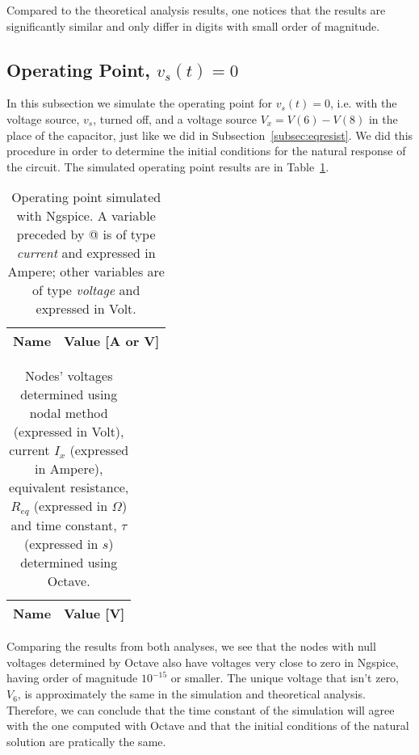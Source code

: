 Compared to the theoretical analysis results, one notices that the results are significantly similar and only differ in digits with small order of magnitude.

\subsection{Operating Point, $v_s(t)=0$} \label{subsec:op2}

In this subsection we simulate the operating point for $v_s(t)=0$, i.e. with the voltage source, $v_s$, turned off, and a voltage source $V_x=V(6)-V(8)$ in the place of the capacitor, just like we did in Subsection~\ref{subsec:eqresist}. We did this procedure in order to determine the initial conditions for the natural response of the circuit. The simulated operating point results are in Table~\ref{tab:op21}.

\vspace{1mm}

\begin{table}[H]
  \centering
  \begin{tabular}{|l|r|}
    \hline    
    {\bf Name} & {\bf Value [A or V]} \\ \hline
    
  \end{tabular}
  \caption{Operating point simulated with Ngspice. A variable preceded by @ is of type {\em current} and expressed in Ampere; other variables are of type {\it voltage} and expressed in Volt.}
  \label{tab:op21}
\end{table}


\begin{table}[H]
  \centering
  \begin{tabular}{|l|r|}
    \hline    
    {\bf Name} & {\bf Value [V]} \\ \hline
    
  \end{tabular}
  \caption{Nodes' voltages determined using nodal method (expressed in Volt), current $I_x$ (expressed in Ampere), equivalent resistance, $R_{eq}$ (expressed in $\Omega$) and time constant, $\tau$ (expressed in $s$) determined using Octave.}
  \label{tab:op22}
\end{table}

Comparing the results from both analyses, we see that the nodes with null voltages determined by Octave also have voltages very close to zero in Ngspice, having order of magnitude $10^{-15}$ or smaller. The unique voltage that isn't zero, $V_6$, is approximately the same in the simulation and theoretical analysis. Therefore, we can conclude that the time constant of the simulation will agree with the one computed with Octave and that the initial conditions of the natural solution are pratically the same.

